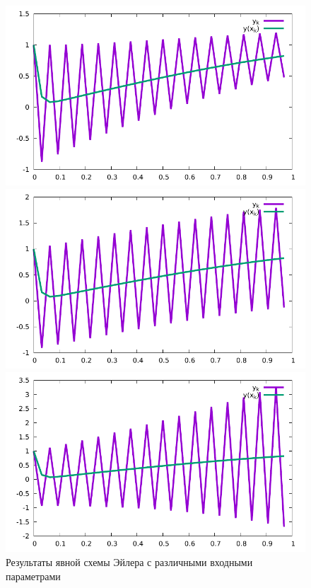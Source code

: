 \begin{figure}[h]\label{fig:courant_with_explicit_schemes}
  \begin{minipage}{.3\linewidth}
    \centering
    \includegraphics[scale=0.4]{16/ConvergingCosineScheme.pdf}
    \caption*{$N=32$, $X=1$, $A=63$}
  \end{minipage}\hfill
  \begin{minipage}{.3\linewidth}
    \centering
    \includegraphics[scale=0.4]{16/StableCosineScheme.pdf}
    \caption*{$N=32$, $X=1$, $A=64$}
  \end{minipage}\hfill
  \begin{minipage}{.3\linewidth}
    \centering
    \includegraphics[scale=0.4]{16/UnstableCosineScheme.pdf}
    \caption*{$N=32$, $X=1$, $A=65$}
  \end{minipage}
  \caption{Результаты явной схемы Эйлера с различными входными параметрами}
\end{figure}

